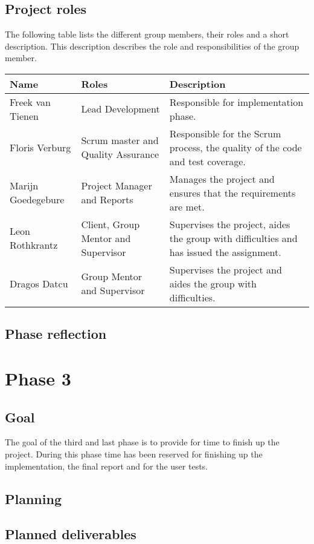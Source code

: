 \subsection{Project roles}
The following table lists the different group members, their roles and a short description.
This description describes the role and responsibilities of the group member.\\
\begin{tabular}{|l|l|p{5cm}|}
\hline
Name & Roles & Description\\
\hline
Freek van Tienen & Lead Development & Responsible for implementation phase.\\
\hline
Floris Verburg & Scrum master and Quality Assurance & Responsible for the Scrum process, the quality of the code and test coverage.\\
\hline
Marijn Goedegebure & Project Manager and Reports & Manages the project and ensures that the requirements are met.\\
\hline
Leon Rothkrantz & Client, Group Mentor and Supervisor & Supervises the project, aides the group with difficulties and has issued the assignment.\\
\hline
Dragos Datcu &  Group Mentor and Supervisor & Supervises the project and aides the group with difficulties.\\
\hline
\end{tabular}
\subsection{Phase reflection}

\section{Phase 3}
\subsection{Goal}
The goal of the third and last phase is to provide for time to finish up the project.
During this phase time has been reserved for finishing up the implementation, the final report and for the user tests.

\subsection{Planning}

\subsection{Planned deliverables}


